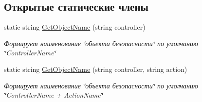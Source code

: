 \subsection*{Открытые статические члены}
\begin{DoxyCompactItemize}
\item 
static string \hyperlink{class_security_1_1_web_1_1_mvc_1_1_authorize_attribute_a78be6f5f0073324063ec70c0e850d61c}{Get\+Object\+Name} (string controller)
\begin{DoxyCompactList}\small\item\em Формирует наименование \char`\"{}объекта безопасности\char`\"{} по умолчанию \char`\"{}\+Controller\+Name\char`\"{} \end{DoxyCompactList}\item 
static string \hyperlink{class_security_1_1_web_1_1_mvc_1_1_authorize_attribute_a41f2910783bad96b5201ad207ffe5e1f}{Get\+Object\+Name} (string controller, string action)
\begin{DoxyCompactList}\small\item\em Формирует наименование \char`\"{}объекта безопасности\char`\"{} по умолчанию \char`\"{}\+Controller\+Name + Action\+Name\char`\"{} \end{DoxyCompactList}\end{DoxyCompactItemize}
